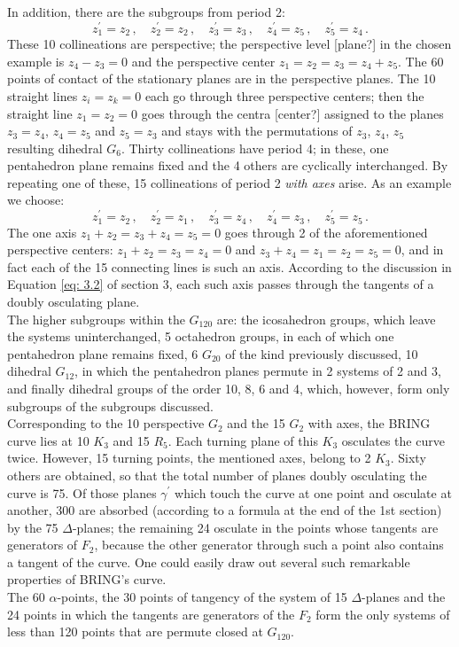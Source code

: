 \documentclass[leqno]{article}
\begin{document}
In addition, there are the subgroups from period 2:
\[
z_1^\prime = z_2 \, , \quad z_2^\prime = z_2 \, , \quad z_3^\prime = z_3 \, , \quad z_4^\prime = z_5 \, , \quad z_5^\prime = z_4 \, . 
\]
These 10 collineations are perspective; the perspective level [plane?] in the chosen example is $z_4 - z_3 = 0$ and the perspective center $z_1 = z_2 = z_3 = z_4+z_5$. The 60 points of contact of the stationary planes are in the perspective planes. The 10 straight lines $z_i=z_k=0$ each go through three perspective centers; then the straight line $z_1 = z_2 = 0$ goes through the centra [center?] assigned to the planes $z_3=z_4$, $z_4=z_5$ and $z_5 = z_3$ and stays with the permutations of $z_3$, $z_4$, $z_5$ resulting dihedral $G_6$. Thirty collineations have period 4; in these, one pentahedron plane remains fixed and the 4 others are cyclically interchanged. By repeating one of these, 15 collineations of period 2 \emph{with axes} arise. As an example we choose:
\[
z_1^\prime = z_2 \, , \quad z_2^\prime = z_1 \, , \quad z_3^\prime = z_4 \, , \quad z_4^\prime = z_3 \, , \quad z_5^\prime = z_5 \, . 
\]
The one axis $z_1 + z_2 = z_3 + z_4 = z_5 = 0$ goes through 2 of the aforementioned perspective centers: $z_1 +z_2 = z_3 = z_4 = 0$ and $z_3 + z_4 = z_1 = z_2 = z_5=0$, and in fact each of the 15 connecting lines is such an axis. According to the discussion in Equation \eqref{eq: 3.2} of section 3, each such axis passes through the tangents of a doubly osculating plane. \\
The higher subgroups within the $G_{120}$ are: the icosahedron groups, which leave the systems uninterchanged, 5 octahedron groups, in each of which one pentahedron plane remains fixed, 6 $G_{20}$ of the kind previously discussed, 10 dihedral $G_{ 12}$, in which the pentahedron planes permute in 2 systems of 2 and 3, and finally dihedral groups of the order 10, 8, 6 and 4, which, however, form only subgroups of the subgroups discussed. \\
Corresponding to the 10 perspective $G_2$ and the 15 $G_2$ with axes, the BRING curve lies at 10 $K_3$ and 15 $R_5$. Each turning plane of this $K_3$ osculates the curve twice. However, 15 turning points, the mentioned axes, belong to 2 $K_3$. Sixty others are obtained, so that the total number of planes doubly osculating the curve is 75. Of those planes $\gamma^\prime$ which touch the curve at one point and osculate at another, 300 are absorbed (according to a formula at the end of the 1st section) by the 75 $\Delta$-planes; the remaining 24 osculate in the points whose tangents are generators of $F_2$, because the other generator through such a point also contains a tangent of the curve. One could easily draw out several such remarkable properties of BRING's curve. \\
The 60 $\alpha$-points, the 30 points of tangency of the system of 15 $\Delta$-planes and the 24 points in which the tangents are generators of the $F_2$ form the only systems of less than 120 points that are permute closed at $G_{120}$.
\end{document}
